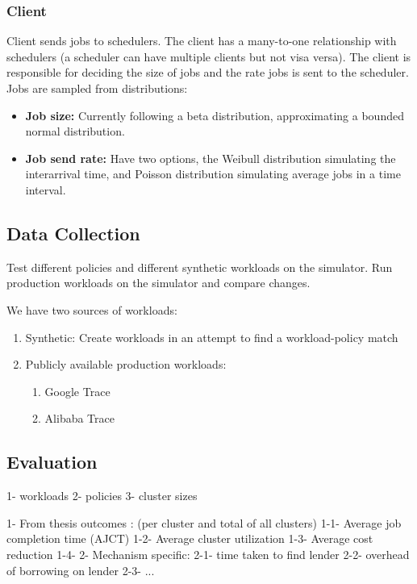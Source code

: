\subsubsection{Client}
Client sends jobs to schedulers. The client has a many-to-one relationship with schedulers
(a scheduler can have multiple clients but not visa versa).
The client is responsible for deciding the size of jobs and the rate jobs is sent to the scheduler.
Jobs are sampled from distributions:
\begin{itemize}
    \item \textbf{Job size:} Currently following a beta distribution, approximating a bounded normal distribution. 
    \item \textbf{Job send rate:} Have two options, the Weibull distribution simulating the interarrival time, and 
    Poisson distribution simulating average jobs in a time interval.
\end{itemize}
\subsection{Data Collection}
Test different policies and different synthetic workloads on the simulator. 
Run production workloads on the simulator and compare changes.

We have two sources of workloads:
\begin{enumerate}
    \item Synthetic: Create workloads in an attempt to find a workload-policy match
    \item Publicly available production workloads:
        \begin{enumerate}
            \item Google Trace %
            \item Alibaba Trace %
        \end{enumerate}
\end{enumerate}

\subsection{Evaluation}

1- workloads %
2- policies 
3- cluster sizes

1- From thesis outcomes : (per cluster and total of all clusters)
    1-1- Average job completion time (AJCT)
    1-2- Average cluster utilization
    1-3- Average cost reduction
    1-4- 
2- Mechanism specific: 
   2-1- time taken to find lender
   2-2- overhead of borrowing on lender
   2-3- ... 
